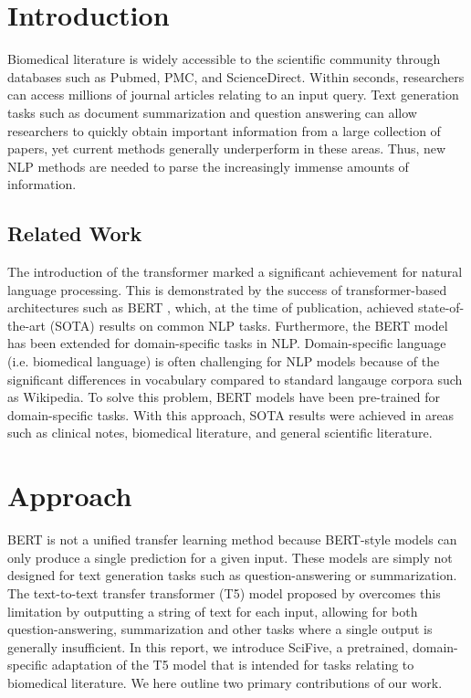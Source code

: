 \documentclass[nocrop]{bioinfo}
\begin{document}


\maketitle

\section{Introduction}
Biomedical literature is widely accessible to the scientific community through databases such as Pubmed, PMC, and ScienceDirect. Within seconds, researchers can access millions of journal articles relating to an input query. Text generation tasks such as document summarization and question answering can allow researchers to quickly obtain important information from a large collection of papers, yet current methods generally underperform in these areas. Thus, new NLP methods are needed to parse the increasingly immense amounts of information.
\subsection{Related Work}
The introduction of the transformer \citep{DBLP:journals/corr/VaswaniSPUJGKP17} marked a significant achievement for natural language processing. This is demonstrated by the success of transformer-based architectures such as BERT \citep{DBLP:journals/corr/abs-1810-04805}, which, at the time of publication, achieved state-of-the-art (SOTA) results on common NLP tasks. Furthermore, the BERT model has been extended for domain-specific tasks in NLP. Domain-specific language (i.e. biomedical language) is often challenging for NLP models because of the significant differences in vocabulary compared to standard langauge corpora such as Wikipedia. To solve this problem, BERT models have been pre-trained for domain-specific tasks. With this approach, SOTA results were achieved in areas such as clinical notes, biomedical literature, and general scientific literature. 
\section{Approach}
BERT \citep{DBLP:journals/corr/abs-1810-04805} is not a unified transfer learning method because BERT-style models can only produce a single prediction for a given input. These models are simply not designed for text generation tasks such as question-answering or summarization.  The text-to-text transfer transformer (T5) model proposed by \cite{DBLP:journals/corr/abs-1910-10683} overcomes this limitation by outputting a string of text for each input, allowing for both question-answering, summarization and other tasks where a single output is generally insufficient. In this report, we introduce SciFive, a pretrained, domain-specific adaptation of the T5 model that is intended for tasks relating to biomedical literature. We here outline two primary contributions of our work. 
\end{document}
